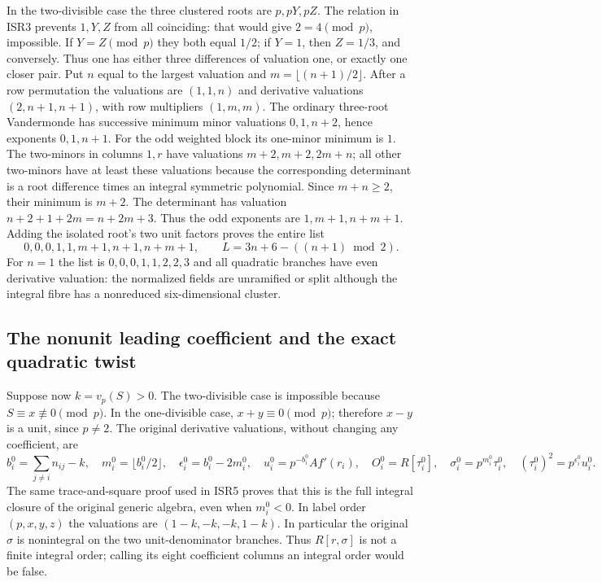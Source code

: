 \documentclass[11pt]{article}
\begin{document}
In the two-divisible case the three clustered roots are $p,pY,pZ$.
The relation in ISR3 prevents $1,Y,Z$ from all coinciding: that would
give $2=4\pmod p$, impossible. If $Y=Z\pmod p$ they both equal
$1/2$; if $Y=1$, then $Z=1/3$, and conversely. Thus one has either
three differences of valuation one, or exactly one closer pair. Put
$n$ equal to the largest valuation and $m=\lfloor(n+1)/2\rfloor$.
After a row permutation the valuations are $(1,1,n)$ and derivative
valuations $(2,n+1,n+1)$, with row multipliers $(1,m,m)$.
The ordinary three-root Vandermonde has successive minimum minor
valuations $0,1,n+2$, hence exponents $0,1,n+1$.
For the odd weighted block its one-minor minimum is $1$.
The two-minors in columns $1,r$ have valuations $m+2,m+2,2m+n$;
all other two-minors have at least these valuations because the
corresponding determinant is a root difference times an integral
symmetric polynomial. Since $m+n\ge2$, their minimum is $m+2$.
The determinant has valuation $n+2+1+2m=n+2m+3$. Thus the odd
exponents are $1,m+1,n+m+1$. Adding the isolated root's two unit
factors proves the entire list
\begin{equation}
 0,0,0,1,1,m+1,n+1,n+m+1,\qquad
 L=3n+6-((n+1)\bmod2).                                 \tag{ISR17}
\end{equation}
For $n=1$ the list is $0,0,0,1,1,2,2,3$ and all quadratic
branches have even derivative valuation: the normalized fields are
unramified or split although the integral fibre has a nonreduced
six-dimensional cluster.

\subsection{The nonunit leading coefficient and the exact quadratic twist}
Suppose now $k=v_p(S)>0$. The two-divisible case is impossible because
$S\equiv x\not\equiv0\pmod p$. In the one-divisible case,
$x+y\equiv0\pmod p$; therefore $x-y$ is a unit, since $p\ne2$.
The original derivative valuations, without changing any coefficient,
are
\begin{equation}
 b_i^0=\sum_{j\ne i}n_{ij}-k,\quad
 m_i^0=\lfloor b_i^0/2\rfloor,\quad
 \epsilon_i^0=b_i^0-2m_i^0,\quad u_i^0=p^{-b_i^0}Af'(r_i),
 \quad O_i^0=R[\tau_i^0],\quad
 \sigma_i^0=p^{m_i^0}\tau_i^0,\quad
 (\tau_i^0)^2=p^{\epsilon_i^0}u_i^0.                     \tag{ISR18}
\end{equation}
The same trace-and-square proof used in ISR5 proves that this is the
full integral closure of the original generic algebra, even when
$m_i^0<0$. In label order $(p,x,y,z)$ the valuations are
$(1-k,-k,-k,1-k)$. In particular the original $\sigma$ is nonintegral
on the two unit-denominator branches. Thus $R[r,\sigma]$ is not a
finite integral order; calling its eight coefficient columns an
integral order would be false.
\end{document}

